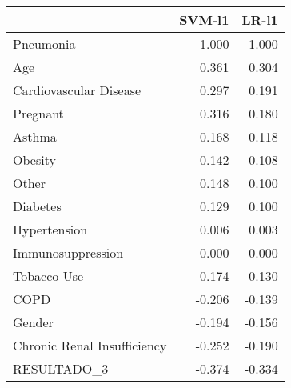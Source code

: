 \begin{tabular}{lrr}
\toprule
{} &  SVM-l1 &  LR-l1 \\
\midrule
Pneumonia                   &   1.000 &  1.000 \\
Age                         &   0.361 &  0.304 \\
Cardiovascular Disease      &   0.297 &  0.191 \\
Pregnant                    &   0.316 &  0.180 \\
Asthma                      &   0.168 &  0.118 \\
Obesity                     &   0.142 &  0.108 \\
Other                       &   0.148 &  0.100 \\
Diabetes                    &   0.129 &  0.100 \\
Hypertension                &   0.006 &  0.003 \\
Immunosuppression           &   0.000 &  0.000 \\
Tobacco Use                 &  -0.174 & -0.130 \\
COPD                        &  -0.206 & -0.139 \\
Gender                      &  -0.194 & -0.156 \\
Chronic Renal Insufficiency &  -0.252 & -0.190 \\
RESULTADO\_3                 &  -0.374 & -0.334 \\
\bottomrule
\end{tabular}
